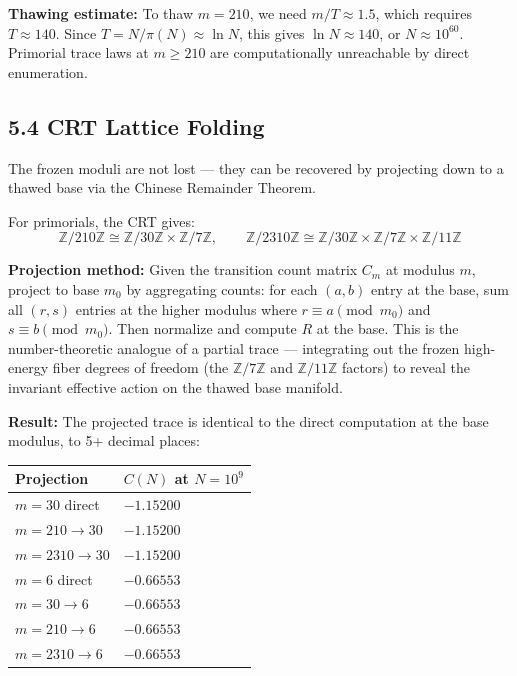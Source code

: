\documentclass[
  11pt,
]{article}
\newcounter{none} %
\numberwithin{equation}{section}
\begin{document}
\textbf{Thawing estimate:} To thaw \(m = 210\), we need
\(m/T \approx 1.5\), which requires \(T \approx 140\). Since
\(T = N/\pi(N) \approx \ln N\), this gives \(\ln N \approx 140\), or
\(N \approx 10^{60}\). Primorial trace laws at \(m \geq 210\) are
computationally unreachable by direct enumeration.

\subsection{5.4 CRT Lattice Folding}\label{crt-lattice-folding}

The frozen moduli are not lost --- they can be recovered by projecting
down to a thawed base via the Chinese Remainder Theorem.

For primorials, the CRT gives:
\begin{equation}\mathbb{Z}/210\mathbb{Z} \cong \mathbb{Z}/30\mathbb{Z} \times \mathbb{Z}/7\mathbb{Z}, \qquad \mathbb{Z}/2310\mathbb{Z} \cong \mathbb{Z}/30\mathbb{Z} \times \mathbb{Z}/7\mathbb{Z} \times \mathbb{Z}/11\mathbb{Z}\end{equation}

\textbf{Projection method:} Given the transition count matrix \(C_m\) at
modulus \(m\), project to base \(m_0\) by aggregating counts: for each
\((a, b)\) entry at the base, sum all \((r, s)\) entries at the higher
modulus where \(r \equiv a \pmod{m_0}\) and \(s \equiv b \pmod{m_0}\).
Then normalize and compute \(R\) at the base. This is the
number-theoretic analogue of a partial trace --- integrating out the
frozen high-energy fiber degrees of freedom (the
\(\mathbb{Z}/7\mathbb{Z}\) and \(\mathbb{Z}/11\mathbb{Z}\) factors) to
reveal the invariant effective action on the thawed base manifold.

\textbf{Result:} The projected trace is identical to the direct
computation at the base modulus, to 5+ decimal places:

{\def\LTcaptype{none} %
\begin{longtable}[]{@{}ll@{}}
\toprule\noalign{}
Projection & \(C(N)\) at \(N = 10^9\) \\
\midrule\noalign{}
\endhead
\bottomrule\noalign{}
\endlastfoot
\(m = 30\) direct & \(-1.15200\) \\
\(m = 210 \to 30\) & \(-1.15200\) \\
\(m = 2310 \to 30\) & \(-1.15200\) \\
\(m = 6\) direct & \(-0.66553\) \\
\(m = 30 \to 6\) & \(-0.66553\) \\
\(m = 210 \to 6\) & \(-0.66553\) \\
\(m = 2310 \to 6\) & \(-0.66553\) \\
\end{longtable}
}
\end{document}

